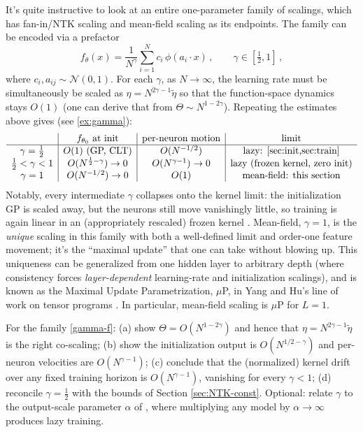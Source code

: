 \documentclass[11pt]{article}
\newcommand{\CN}{{\mathcal N}}
\begin{document}
It's quite instructive to look at an entire one-parameter family of scalings, which has fan-in/NTK scaling and mean-field scaling as its endpoints. The family can be encoded via a prefactor
%
\begin{equation} \label{gamma-f}
    f_\theta(x) = \frac{1}{N^{\gamma}} \sum_{i=1}^N c_i\,\phi(a_i\cdot x)\,,\qquad \gamma\in[\tfrac{1}{2},1]\,,
\end{equation}
%
where $c_i, a_{ij}\sim \CN(0,1)$. For each $\gamma$, as $N\to\infty$, the learning rate must be simultaneously be scaled as $\eta = N^{2\gamma-1}\tilde\eta$ so that the function-space dynamics stays $O(1)$ (one can derive that from $\Theta\sim N^{1-2\gamma}$). Repeating the estimates above gives (see \cref{ex:gamma}):
%
\begin{equation}
\begin{array}{c|c|c|c}
    & f_{\theta_0} \text{ at init} & \text{per-neuron motion} & \text{limit} \\\hline
    \gamma=\tfrac{1}{2} & O(1) \text{ (GP, CLT)} & O(N^{-1/2}) & \text{lazy: \cref{sec:init,sec:train}} \\
    \tfrac{1}{2}<\gamma<1 & O(N^{\frac{1}{2}-\gamma})\to 0 & O(N^{\gamma-1})\to 0 & \text{lazy (frozen kernel, zero init)} \\
    \gamma=1 & O(N^{-1/2})\to 0 & O(1) & \text{mean-field: this section}
\end{array}
\end{equation}
%
Notably, every intermediate $\gamma$ collapses onto the kernel limit: the initialization GP is scaled away, but the neurons still move vanishingly little, so training is again linear in an (appropriately rescaled) frozen kernel \cite{chizat2019lazy,mei2018mean}. Mean-field, $\gamma=1$, is the \emph{unique} scaling in this family with both a well-defined limit and order-one feature movement; it's the ``maximal update'' that one can take without blowing up. This uniqueness can be generalized from one hidden layer to arbitrary depth (where consistency forces \emph{layer-dependent} learning-rate and initialization scalings), and is known as the Maximal Update Parametrization, $\mu$P, in Yang and Hu's line of work on tensor programs \cite{yang2021tensor}. In particular, mean-field scaling is $\mu$P for $L=1$.

\begin{exercise}
\label{ex:gamma}
For the family \eqref{gamma-f}: (a) show $\Theta = O(N^{1-2\gamma})$ and hence that $\eta = N^{2\gamma-1}\tilde\eta$ is the right co-scaling; (b) show the initialization output is $O(N^{1/2-\gamma})$ and per-neuron velocities are $O(N^{\gamma-1})$; (c) conclude that the (normalized) kernel drift over any fixed training horizon is $O(N^{\gamma-1})$, vanishing for every $\gamma<1$; (d) reconcile $\gamma=\frac{1}{2}$ with the bounds of Section \ref{sec:NTK-const}. Optional: relate $\gamma$ to the output-scale parameter $\alpha$ of \cite{chizat2019lazy}, where multiplying any model by $\alpha\to\infty$ produces lazy training.
\end{exercise}
\end{document}
